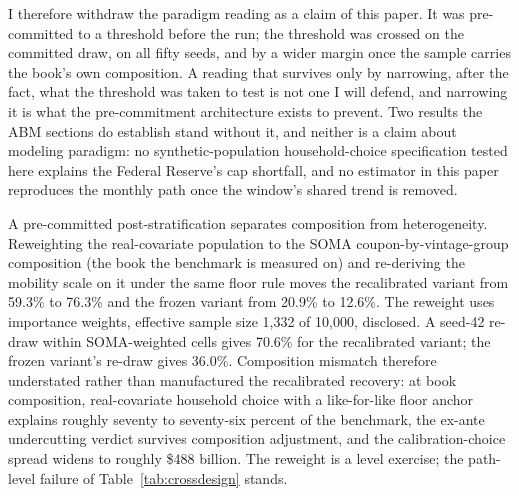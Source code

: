 \documentclass[12pt]{article}
\begin{document}
I therefore withdraw the paradigm reading as a claim of this paper. It was pre-committed to a threshold before the run; the threshold was crossed on the committed draw, on all fifty seeds, and by a wider margin once the sample carries the book's own composition. A reading that survives only by narrowing, after the fact, what the threshold was taken to test is not one I will defend, and narrowing it is what the pre-commitment architecture exists to prevent. Two results the ABM sections do establish stand without it, and neither is a claim about modeling paradigm: no synthetic-population household-choice specification tested here explains the Federal Reserve's cap shortfall, and no estimator in this paper reproduces the monthly path once the window's shared trend is removed.

A pre-committed post-stratification separates composition from heterogeneity. Reweighting the real-covariate population to the SOMA coupon-by-vintage-group composition (the book the benchmark is measured on) and re-deriving the mobility scale on it under the same floor rule moves the recalibrated variant from 59.3\% to 76.3\% and the frozen variant from 20.9\% to 12.6\%. The reweight uses importance weights, effective sample size 1{,}332 of 10{,}000, disclosed. A seed-42 re-draw within SOMA-weighted cells gives 70.6\% for the recalibrated variant; the frozen variant's re-draw gives 36.0\%. Composition mismatch therefore understated rather than manufactured the recalibrated recovery: at book composition, real-covariate household choice with a like-for-like floor anchor explains roughly seventy to seventy-six percent of the benchmark, the ex-ante undercutting verdict survives composition adjustment, and the calibration-choice spread widens to roughly \$488 billion. The reweight is a level exercise; the path-level failure of Table~\ref{tab:crossdesign} stands.
\end{document}
